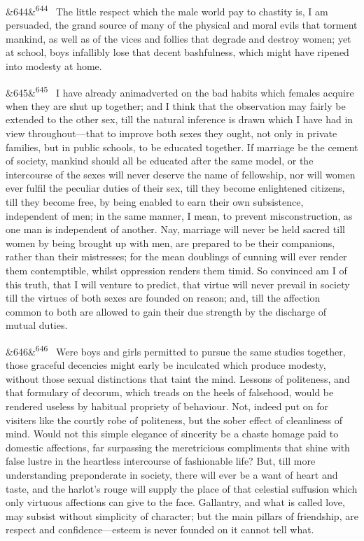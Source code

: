 \documentclass[12pt]{article}
\newcommand{\para}[1][]{\par\noindent\ifx&#1&\else\textsuperscript{\footnotesize #1}~\fi}
\begin{document}
\para[644] The little respect which the male world pay to chastity is, I am persuaded, the grand source of many of the physical and moral evils that torment mankind, as well as of the vices and follies that degrade and destroy women; yet at school, boys infallibly lose that decent bashfulness, which might have ripened into modesty at home.

\para[645] I have already animadverted on the bad habits which females acquire when they are shut up together; and I think that the observation may fairly be extended to the other sex, till the natural inference is drawn which I have had in view throughout---that to improve both sexes they ought, not only in private families, but in public schools, to be educated together. If marriage be the cement of society, mankind should all be educated after the same model, or the intercourse of the sexes will never deserve the name of fellowship, nor will women ever fulfil the peculiar duties of their sex, till they become enlightened citizens, till they become free, by being enabled to earn their own subsistence, independent of men; in the same manner, I mean, to prevent misconstruction, as one man is independent of another. Nay, marriage will never be held sacred till women by being brought up with men, are prepared to be their companions, rather than their mistresses; for the mean doublings of cunning will ever render them contemptible, whilst oppression renders them timid. So convinced am I of this truth, that I will venture to predict, that virtue will never prevail in society till the virtues of both sexes are founded on reason; and, till the affection common to both are allowed to gain their due strength by the discharge of mutual duties.

\para[646] Were boys and girls permitted to pursue the same studies together, those graceful decencies might early be inculcated which produce modesty, without those sexual distinctions that taint the mind. Lessons of politeness, and that formulary of decorum, which treads on the heels of falsehood, would be rendered useless by habitual propriety of behaviour. Not, indeed put on for visiters like the courtly robe of politeness, but the sober effect of cleanliness of mind. Would not this simple elegance of sincerity be a chaste homage paid to domestic affections, far surpassing the meretricious compliments that shine with false lustre in the heartless intercourse of fashionable life? But, till more understanding preponderate in society, there will ever be a want of heart and taste, and the harlot's rouge will supply the place of that celestial suffusion which only virtuous affections can give to the face. Gallantry, and what is called love, may subsist without simplicity of character; but the main pillars of friendship, are respect and confidence---esteem is never founded on it cannot tell what.
\end{document}
